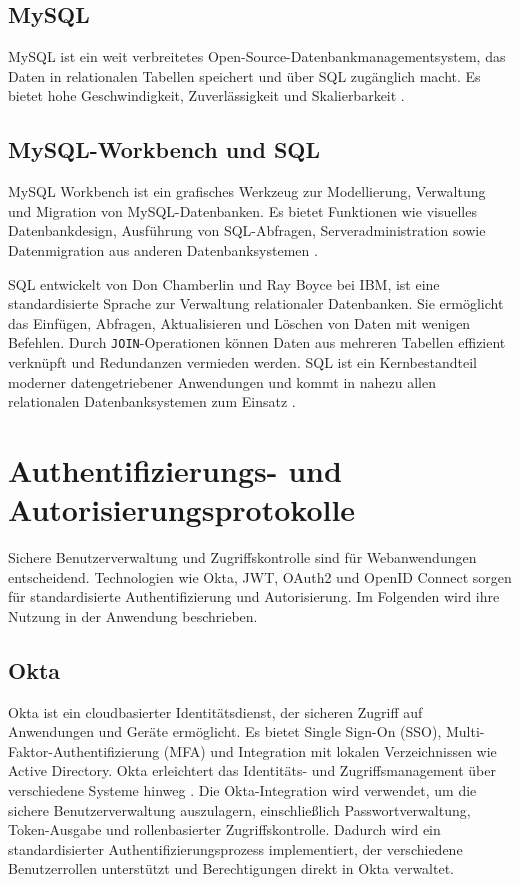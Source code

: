 \subsection{MySQL}
MySQL ist ein weit verbreitetes Open-Source-Datenbankmanagementsystem, das Daten in relationalen Tabellen speichert und über SQL zugänglich macht. Es bietet hohe Geschwindigkeit, Zuverlässigkeit und Skalierbarkeit \cite{ORACLE2025b}.

\subsection{MySQL-Workbench und SQL}
MySQL Workbench ist ein grafisches Werkzeug zur Modellierung, Verwaltung und Migration von MySQL-Datenbanken. Es bietet Funktionen wie visuelles Datenbankdesign, Ausführung von SQL-Abfragen, Serveradministration sowie Datenmigration aus anderen Datenbanksystemen \cite{ORACLE2025d}. 

\noindent SQL entwickelt von Don Chamberlin und Ray Boyce bei IBM, ist eine standardisierte Sprache zur Verwaltung relationaler Datenbanken. Sie ermöglicht das Einfügen, Abfragen, Aktualisieren und Löschen von Daten mit wenigen Befehlen. Durch \texttt{JOIN}-Operationen können Daten aus mehreren Tabellen effizient verknüpft und Redundanzen vermieden werden. SQL ist ein Kernbestandteil moderner datengetriebener Anwendungen und kommt in nahezu allen relationalen Datenbanksystemen zum Einsatz \cite{IBM2025}. 

\section{Authentifizierungs- und Autorisierungsprotokolle}

Sichere Benutzerverwaltung und Zugriffskontrolle sind für Webanwendungen entscheidend. Technologien wie Okta, JWT, OAuth2 und OpenID Connect sorgen für standardisierte Authentifizierung und Autorisierung. Im Folgenden wird ihre Nutzung in der Anwendung beschrieben.

\subsection{Okta}
Okta ist ein cloudbasierter Identitätsdienst, der sicheren Zugriff auf Anwendungen und Geräte ermöglicht. Es bietet Single Sign-On (SSO), Multi-Faktor-Authentifizierung (MFA) und Integration mit lokalen Verzeichnissen wie Active Directory. Okta erleichtert das Identitäts- und Zugriffsmanagement über verschiedene Systeme hinweg \cite{OKTA2025}. Die Okta-Integration wird verwendet, um die sichere Benutzerverwaltung auszulagern, einschließlich Passwortverwaltung, Token-Ausgabe und rollenbasierter Zugriffskontrolle. Dadurch wird ein standardisierter Authentifizierungsprozess implementiert, der verschiedene Benutzerrollen unterstützt und Berechtigungen direkt in Okta verwaltet.

